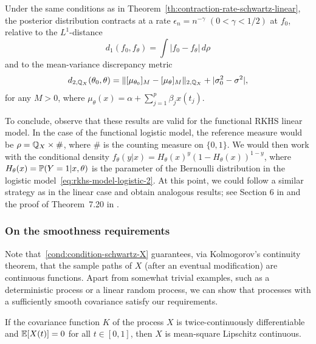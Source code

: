 \begin{corollary}\label{corollary:contraction-rate-schwartz-linear-2}
  Under the same conditions as in Theorem~\ref{th:contraction-rate-schwartz-linear}, the posterior distribution contracts at a rate \(\epsilon_n=n^{-\gamma}\) \((0<\gamma<1/2)\) at \(f_0\), relative to the \(L^1\)-distance 
  \[
    d_1(f_0, f_\theta)=\int |f_0 - f_\theta|\, d\rho
  \] 
  and to the mean-variance discrepancy metric 
  \[
    d_{2,\mathbb{Q}_X}(\theta_0, \theta) = \|[\mu_{\theta_0}]_M - [\mu_\theta]_M\|_{2,\mathbb{Q}_X} + |\sigma_0^2 - \sigma^2|,
  \]
  for any \(M>0\), where \(\mu_\theta(x)= \alpha + \sum_{j=1}^p \beta_j x(t_j)\).
\end{corollary}

To conclude, observe that these results are valid for the functional \acs{RKHS} linear model. In the case of the functional logistic model, the reference measure would be \(\rho=\mathbb{Q}_X \times \#\), where \(\#\) is the counting measure on \(\{0,1\}\). We would then work with the conditional density \(f_\theta(y|x)=H_\theta(x)^y (1-H_\theta(x))^{1-y}\), where \(H_\theta(x)=\mathbb{P}(Y=1|x,\theta)\) is the parameter of the Bernoulli distribution in the logistic model~\eqref{eq:rkhs-model-logistic-2}. At this point, we could follow a similar strategy as in the linear case and obtain analogous results; see Section 6 in \citet{ghosal2006posterior} and the proof of Theorem~7.20 in \citet{ghosal2017fundamentals}.

\subsubsection*{On the smoothness requirements}

Note that~\ref{cond:condition-schwartz-X} guarantees, via Kolmogorov's continuity theorem, that the sample paths of \(X\) (after an eventual modification) are continuous functions. Apart from somewhat trivial examples, such as a deterministic process or a linear random process, we can show that processes with a sufficiently smooth covariance satisfy our requirements.

\begin{lemma}\label{lemma:mean-square-lipschitz}
  If the covariance function \(K\) of the process \(X\) is twice-continuously differentiable and \(\mathbb{E}[X(t)]=0\) for all \(t\in[0,1]\), then \(X\) is mean-square Lipschitz continuous.
\end{lemma}


